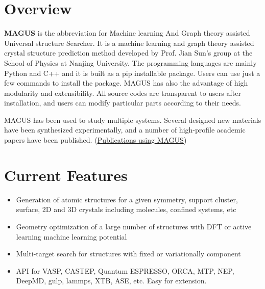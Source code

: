 \documentclass[12pt,oneside]{book}
\begin{document}
\section{Overview}
\textbf{MAGUS} is the abbreviation for Machine learning And Graph theory assisted Universal structure Searcher. It is a machine learning and graph theory assisted crystal structure prediction method developed by Prof. Jian Sun's group at the School of Physics at Nanjing University. The programming languages are mainly Python and C++ and it is built as a pip installable package. Users can use just a few commands to install the package. MAGUS has also the advantage of high modularity and extensibility. All source codes are transparent to users after installation, and users can modify particular parts according to their needs.

MAGUS has been used to study multiple systems. Several designed new materials have been synthesized experimentally, and a number of high-profile academic papers have been published. (\href{https://gitlab.com/bigd4/magus/-/wikis/home/Publications}{Publications using MAGUS})

\section{Current Features}
\begin{itemize}
    \item Generation of atomic structures for a given symmetry, support cluster, surface, 2D and 3D crystals including molecules, confined systems, etc
    \item Geometry optimization of a large number of structures with DFT or active learning machine learning potential
    \item Multi-target search for structures with fixed or variationally component
    \item API for VASP, CASTEP, Quantum ESPRESSO, ORCA, MTP, NEP, DeepMD, gulp, lammps, XTB, ASE, etc. Easy for extension.
\end{itemize}
\end{document}
